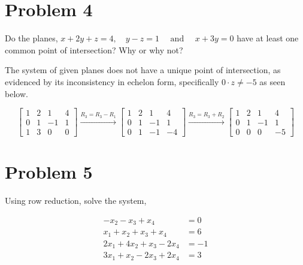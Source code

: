 \documentclass[letter,11pt]{article}
\begin{document}
\section{Problem 4}
Do the planes, $x+2 y+z=4, \quad y-z=1 \quad \text { and } \quad x+3 y=0$ have at least one common point of intersection? Why or why not?
\vspace{1cm}
\begin{tcolorbox}[boxrule=1mm, width=(.9\linewidth),before=\hfill,after=\hfill, adjusted title={Problem 4 Solution}]
The system of given planes does not have a unique point of intersection, as evidenced by its inconsistency in echelon form, specifically $0\cdot z \neq -5$ as seen below.
\tcblower

$$\begin{bmatrix}
1 & 2 & 1 & 4 \\
0 & 1 & -1 & 1 \\
1 & 3 & 0 & 0
\end{bmatrix}\xrightarrow{R_3=R_3-R_1}
\begin{bmatrix}
1 & 2 & 1 & 4 \\
0 & 1 & -1 & 1 \\
0 & 1 & -1 & -4
\end{bmatrix}\xrightarrow{R_3=R_3+R_2}
\begin{bmatrix}
1 & 2 & 1 & 4 \\
0 & 1 & -1 & 1 \\
0 & 0 & 0 & -5
\end{bmatrix}$$
\end{tcolorbox}

\section{Problem 5} Using row reduction, solve the system,

\begin{align*}
-x_{2}-x_{3}+x_{4} & =0 \\
x_{1}+x_{2}+x_{3}+x_{4} & =6 \\
2 x_{1}+4 x_{2}+x_{3}-2 x_{4} & =-1 \\
3 x_{1}+x_{2}-2 x_{3}+2 x_{4} & =3
\end{align*}
\end{document}
